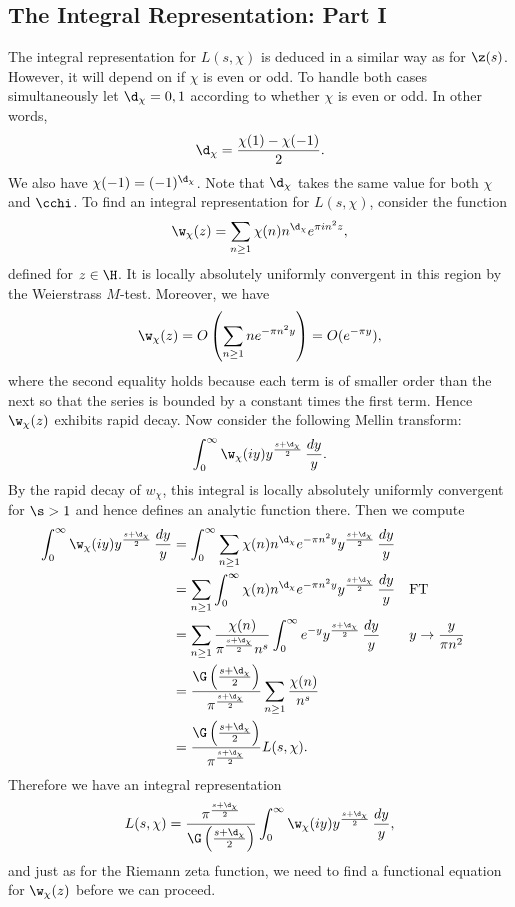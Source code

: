     \subsection*{The Integral Representation: Part I}
      The integral representation for $L(s,\chi)$ is deduced in a similar way as for $\z(s)$. However, it will depend on if $\chi$ is even or odd. To handle both cases simultaneously let $\d_{\chi} = 0,1$ according to whether $\chi$ is even or odd. In other words,
      \[
        \d_{\chi} = \frac{\chi(1)-\chi(-1)}{2}.
      \]
      We also have $\chi(-1) = (-1)^{\d_{\chi}}$. Note that $\d_{\chi}$ takes the same value for both $\chi$ and $\cchi$. To find an integral representation for $L(s,\chi)$, consider the function
      \[
        \w_{\chi}(z) = \sum_{n \ge 1}\chi(n)n^{\d_{\chi}}e^{\pi in^{2}z},
      \]
      defined for $z \in \H$. It is locally absolutely uniformly convergent in this region by the Weierstrass $M$-test. Moreover, we have
      \[
        \w_{\chi}(z) = O\left(\sum_{n \ge 1}ne^{-\pi n^{2}y}\right) = O(e^{-\pi y}),
      \]
      where the second equality holds because each term is of smaller order than the next so that the series is bounded by a constant times the first term. Hence $\w_{\chi}(z)$ exhibits rapid decay. Now consider the following Mellin transform:
      \[
        \int_{0}^{\infty}\w_{\chi}(iy)y^{\frac{s+\d_{\chi}}{2}}\,\frac{dy}{y}.
      \]
      By the rapid decay of $w_{\chi}$, this integral is locally absolutely uniformly convergent for $\s > 1$ and hence defines an analytic function there. Then we compute
      \begin{align*}
        \int_{0}^{\infty}\w_{\chi}(iy)y^{\frac{s+\d_{\chi}}{2}}\,\frac{dy}{y} &= \int_{0}^{\infty}\sum_{n \ge 1}\chi(n)n^{\d_{\chi}}e^{-\pi n^{2}y}y^{\frac{s+\d_{\chi}}{2}}\,\frac{dy}{y} \\
        &= \sum_{n \ge 1}\int_{0}^{\infty}\chi(n)n^{\d_{\chi}}e^{-\pi n^{2}y}y^{\frac{s+\d_{\chi}}{2}}\,\frac{dy}{y} && \text{FT} \\
        &= \sum_{n \ge 1}\frac{\chi(n)}{\pi^{\frac{s+\d_{\chi}}{2}}n^{s}}\int_{0}^{\infty}e^{-y}y^{\frac{s+\d_{\chi}}{2}}\,\frac{dy}{y} && \text{$y \to \frac{y}{\pi n^{2}}$} \\
        &= \frac{\G\left(\frac{s+\d_{\chi}}{2}\right)}{\pi^{\frac{s+\d_{\chi}}{2}}}\sum_{n \ge 1}\frac{\chi(n)}{n^{s}} \\
        &= \frac{\G\left(\frac{s+\d_{\chi}}{2}\right)}{\pi^{\frac{s+\d_{\chi}}{2}}}L(s,\chi).
      \end{align*}
      Therefore we have an integral representation
      \begin{equation}\label{equ:integral_representation_Dirichlet_L-functions_1}
        L(s,\chi) = \frac{\pi^{\frac{s+\d_{\chi}}{2}}}{\G\left(\frac{s+\d_{\chi}}{2}\right)}\int_{0}^{\infty}\w_{\chi}(iy)y^{\frac{s+\d_{\chi}}{2}}\,\frac{dy}{y},
      \end{equation}
      and just as for the Riemann zeta function, we need to find a functional equation for $\w_{\chi}(z)$ before we can proceed.
